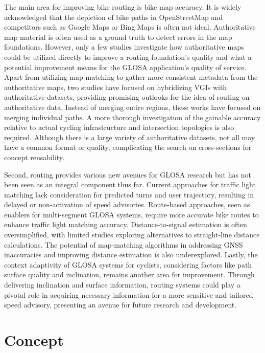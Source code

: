 \begin{Summary}
The main area for improving bike routing is bike map accuracy. It is widely acknowledged that the depiction of bike paths in OpenStreetMap and competitors such as Google Maps or Bing Maps is often not ideal. Authoritative map material is often used as a ground truth to detect errors in the map foundations. However, only a few studies investigate how authoritative maps could be utilized directly to improve a routing foundation's quality and what a potential improvement means for the GLOSA application's quality of service. Apart from utilizing map matching to gather more consistent metadata from the authoritative maps, two studies have focused on hybridizing VGIs with authoritative datasets, providing promising outlooks for the idea of routing on authoritative data. Instead of merging entire regions, these works have focused on merging individual paths. A more thorough investigation of the gainable accuracy relative to actual cycling infrastructure and intersection topologies is also required. Although there is a large variety of authoritative datasets, not all may have a common format or quality, complicating the search on cross-sections for concept reusability.

Second, routing provides various new avenues for GLOSA research but has not been seen as an integral component thus far. Current approaches for traffic light matching lack consideration for predicted turns and user trajectory, resulting in delayed or non-activation of speed advisories. Route-based approaches, seen as enablers for multi-segment GLOSA systems, require more accurate bike routes to enhance traffic light matching accuracy. Distance-to-signal estimation is often oversimplified, with limited studies exploring alternatives to straight-line distance calculations. The potential of map-matching algorithms in addressing GNSS inaccuracies and improving distance estimation is also underexplored. Lastly, the context adaptivity of GLOSA systems for cyclists, considering factors like path surface quality and inclination, remains another area for improvement. Through delivering inclination and surface information, routing systems could play a pivotal role in acquiring necessary information for a more sensitive and tailored speed advisory, presenting an avenue for future research and development.
\end{Summary}

\section{Concept}

